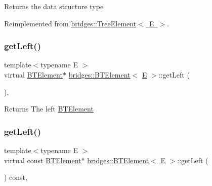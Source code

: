 \begin{DoxyReturn}{Returns}
the data structure type 
\end{DoxyReturn}


Reimplemented from \mbox{\hyperlink{classbridges_1_1_tree_element_a6b264d7391442a742edf96bdd5ee5442}{bridges\+::\+Tree\+Element$<$ E $>$}}.

\mbox{\label{classbridges_1_1_b_t_element_ab5955c2611b6ae8c3c48508e3e983f87}} 
\subsubsection{\texorpdfstring{getLeft()}{getLeft()}\hspace{0.1cm}{\footnotesize\ttfamily [1/2]}}
{\footnotesize\ttfamily template$<$typename E $>$ \\
virtual \mbox{\hyperlink{classbridges_1_1_b_t_element}{B\+T\+Element}}$\ast$ \mbox{\hyperlink{classbridges_1_1_b_t_element}{bridges\+::\+B\+T\+Element}}$<$ \mbox{\hyperlink{namespacebridges_acfb0a4f7877d8f63de3e6862004c50eda3a3ea00cfc35332cedf6e5e9a32e94da}{E}} $>$\+::get\+Left (\begin{DoxyParamCaption}{ }\end{DoxyParamCaption})\hspace{0.3cm}{\ttfamily [inline]}, {\ttfamily [virtual]}}

\begin{DoxyReturn}{Returns}
The left \mbox{\hyperlink{classbridges_1_1_b_t_element}{B\+T\+Element}} 
\end{DoxyReturn}
\mbox{\label{classbridges_1_1_b_t_element_a01ebba851e9cc6ec77df16201604597a}} 
\subsubsection{\texorpdfstring{getLeft()}{getLeft()}\hspace{0.1cm}{\footnotesize\ttfamily [2/2]}}
{\footnotesize\ttfamily template$<$typename E $>$ \\
virtual const \mbox{\hyperlink{classbridges_1_1_b_t_element}{B\+T\+Element}}$\ast$ \mbox{\hyperlink{classbridges_1_1_b_t_element}{bridges\+::\+B\+T\+Element}}$<$ \mbox{\hyperlink{namespacebridges_acfb0a4f7877d8f63de3e6862004c50eda3a3ea00cfc35332cedf6e5e9a32e94da}{E}} $>$\+::get\+Left (\begin{DoxyParamCaption}{ }\end{DoxyParamCaption}) const\hspace{0.3cm}{\ttfamily [inline]}, {\ttfamily [virtual]}}

